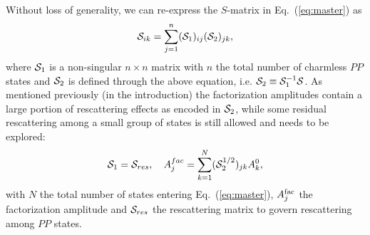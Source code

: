 \documentclass[aps,preprint,floats,epsf,epsfig,nofootinbib,letter]{revtex4}
\newcommand{\be}{\begin{eqnarray}}
\newcommand{\en}{\end{eqnarray}}
\newcommand{\Sc}{{\cal S}}
\begin{document}
Without loss of generality, we can re-express the $S$-matrix in
Eq.~(\ref{eq:master}) as
 \be
 \Sc_{ik}=\sum_{j=1}^n(\Sc_1)_{ij} (\Sc_2)_{jk},
 \label{eq:S1S2}
 \en
where $\Sc_1$ is a non-singular $n\times n$ matrix with $n$ the
total number of charmless $PP$ states and $\Sc_2$ is defined
through the above equation, i.e. $\Sc_2\equiv \Sc^{-1}_{1} \Sc$.
As mentioned previously (in the introduction)
the factorization amplitudes contain a large portion of rescattering effects as encoded in ${\cal S}_2$,
while some
residual rescattering among a small group of states is still allowed and needs to be explored:
 \be
 \Sc_1=\Sc_{res},\quad
 A^{ fac}_j=\sum_{k=1}^N(\Sc^{1/2}_2)_{jk}A^0_k,
 \label{eq:res}
 \en
with $N$ the total number of states entering Eq.~(\ref{eq:master}),
$A^{\rm fac}_j$ the factorization amplitude and $\Sc_{res}$ the rescattering matrix to govern rescattering among $PP$ states.  
\end{document}
